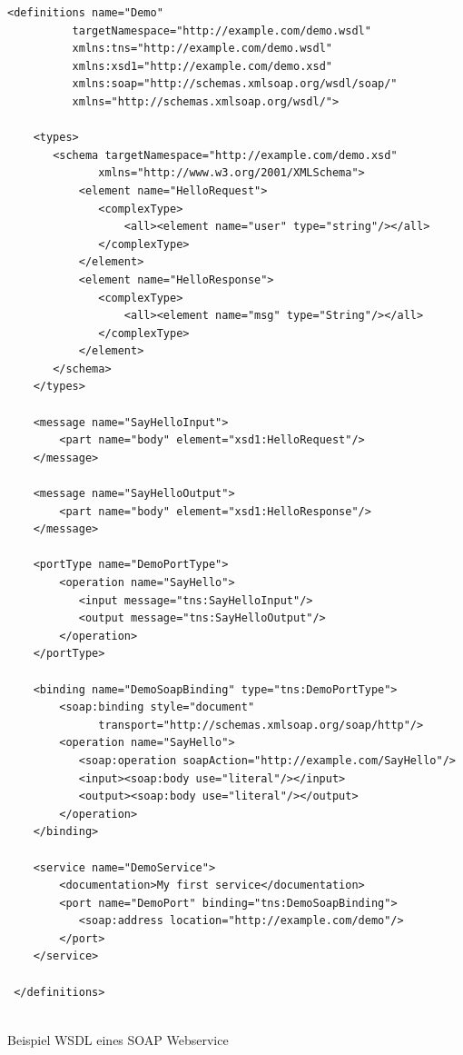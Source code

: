 \begin{listing}[H]
\begin{verbatim}
<definitions name="Demo" 
          targetNamespace="http://example.com/demo.wsdl"
          xmlns:tns="http://example.com/demo.wsdl"
          xmlns:xsd1="http://example.com/demo.xsd"
          xmlns:soap="http://schemas.xmlsoap.org/wsdl/soap/"
          xmlns="http://schemas.xmlsoap.org/wsdl/">
 
    <types>
       <schema targetNamespace="http://example.com/demo.xsd"
              xmlns="http://www.w3.org/2001/XMLSchema">
           <element name="HelloRequest">
              <complexType>
                  <all><element name="user" type="string"/></all>
              </complexType>
           </element>
           <element name="HelloResponse">
              <complexType>
                  <all><element name="msg" type="String"/></all>
              </complexType>
           </element>
       </schema>
    </types>
 
    <message name="SayHelloInput">
        <part name="body" element="xsd1:HelloRequest"/>
    </message>
 
    <message name="SayHelloOutput">
        <part name="body" element="xsd1:HelloResponse"/>
    </message>
 
    <portType name="DemoPortType">
        <operation name="SayHello">
           <input message="tns:SayHelloInput"/>
           <output message="tns:SayHelloOutput"/>
        </operation>
    </portType>
 
    <binding name="DemoSoapBinding" type="tns:DemoPortType">
        <soap:binding style="document" 
              transport="http://schemas.xmlsoap.org/soap/http"/>
        <operation name="SayHello">
           <soap:operation soapAction="http://example.com/SayHello"/>
           <input><soap:body use="literal"/></input>
           <output><soap:body use="literal"/></output>
        </operation>
    </binding>
 
    <service name="DemoService">
        <documentation>My first service</documentation>
        <port name="DemoPort" binding="tns:DemoSoapBinding">
           <soap:address location="http://example.com/demo"/>
        </port>
    </service>
 
 </definitions>


\end{verbatim}
\caption{Beispiel WSDL eines SOAP Webservice}
\end{listing}


